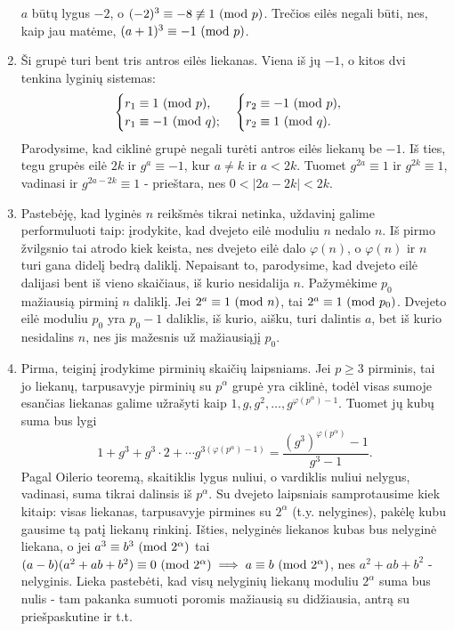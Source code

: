 \begin{enumerate}
$a$ būtų lygus $-2$, o $(-2)^3 \equiv -8 \not \equiv 1\ (\text{mod } p)$. Trečios
eilės negali būti, nes, kaip jau matėme, $(a+1)^3 \equiv -1 \ (\text{mod } p)$.
\item 
Ši grupė turi bent tris antros eilės liekanas. Viena iš jų $-1$, o
kitos dvi tenkina lyginių sistemas: $$
\begin{cases}
  r_1 \equiv 1 \ (\text{mod } p),\\
  r_1 \equiv -1 \ (\text{mod } q);
\end{cases}
\begin{cases}
  r_2 \equiv -1 \ (\text{mod } p),\\
  r_2 \equiv 1 \ (\text{mod } q).
\end{cases}$$
Parodysime, kad ciklinė grupė negali turėti antros eilės liekanų be
$-1$. Iš ties, tegu grupės eilė $2k$ ir $g^a \equiv -1$, kur
$a \neq k$ ir $a < 2k$. Tuomet $g^{2a}\equiv 1$ ir $g^{2k} \equiv 1$, vadinasi ir
$g^{2a-2k}\equiv 1$ - prieštara, nes $0<|2a - 2k|< 2k$.
\item 
Pastebėję, kad lyginės $n$ reikšmės tikrai netinka, uždavinį galime
performuluoti taip: įrodykite, kad dvejeto eilė moduliu $n$ nedalo
$n$. Iš pirmo žvilgsnio tai atrodo kiek keista, nes dvejeto eilė dalo
$\varphi(n)$, o $\varphi(n)$ ir $n$ turi gana didelį bedrą daliklį.
Nepaisant to, parodysime, kad dvejeto eilė dalijasi bent iš vieno
skaičiaus, iš kurio nesidalija $n$. Pažymėkime $p_0$ mažiausią pirminį
$n$ daliklį. Jei $2^a \equiv 1 \ (\text{mod } n)$, tai $2^a \equiv 1 \ (\text{mod } p_0)$.
Dvejeto eilė moduliu $p_0$ yra $p_0-1$ daliklis, iš kurio, aišku, turi
dalintis $a$, bet iš kurio nesidalins $n$, nes jis mažesnis už
mažiausiąjį $p_0$.
\item 
Pirma, teiginį įrodykime pirminių skaičių laipsniams. Jei $p\geq 3$
pirminis, tai jo liekanų, tarpusavyje pirminių su $p^{\alpha}$ grupė
yra ciklinė, todėl visas sumoje esančias liekanas galime užrašyti kaip
$1, g, g^2, \dots, g^{\varphi(p^{\alpha})-1}$. Tuomet jų kubų suma bus lygi
$$1 + g^3 + g^3\cdot 2 + \cdots g^{3 (\varphi(p^\alpha)-1)} =
\frac{(g^3)^{\varphi(p^{\alpha})}-1}{g^3 - 1}.$$ Pagal Oilerio teoremą,
skaitiklis lygus nuliui, o vardiklis nuliui nelygus, 
vadinasi, suma tikrai dalinsis iš $p^{\alpha}$. Su dvejeto laipsniais
samprotausime kiek kitaip: visas liekanas, tarpusavyje pirmines su
$2^{\alpha}$ (t.y. nelygines), pakėlę kubu gausime tą patį liekanų
rinkinį. Išties, nelyginės liekanos kubas bus nelyginė liekana, o
jei $a^3 \equiv b^3 \ (\text{mod } 2^{\alpha})$ tai $(a-b)(a^2 + ab + b^2) \equiv
0\ (\text{mod } 2^{\alpha}) \implies a\equiv b\ (\text{mod } 2^{\alpha})$, nes $a^2 + ab +
b^2$ -nelyginis. Lieka pastebėti, kad visų nelyginių liekanų moduliu
$2^{\alpha}$ suma bus nulis - tam pakanka sumuoti poromis mažiausią
su didžiausia, antrą su priešpaskutine ir t.t.


\end{enumerate}
